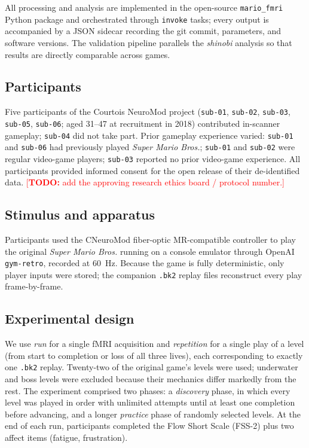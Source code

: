 \documentclass{article}
\newcommand{\TODO}[1]{\textcolor{red}{[\textbf{TODO:} #1]}}
\begin{document}
All processing and analysis are implemented in the open-source \texttt{mario\_fmri} Python
package and orchestrated through \texttt{invoke} tasks; every output is accompanied by a JSON
sidecar recording the git commit, parameters, and software versions. The validation pipeline
parallels the \textit{shinobi} analysis\cite{harel2025shinobi} so that results are directly
comparable across games.

\subsection*{Participants}
Five participants of the Courtois NeuroMod project (\texttt{sub-01}, \texttt{sub-02},
\texttt{sub-03}, \texttt{sub-05}, \texttt{sub-06}; aged 31--47 at recruitment in 2018)
contributed in-scanner gameplay; \texttt{sub-04} did not take part. Prior gameplay experience
varied: \texttt{sub-01} and \texttt{sub-06} had previously played \textit{Super Mario Bros.};
\texttt{sub-01} and \texttt{sub-02} were regular video-game players; \texttt{sub-03} reported no
prior video-game experience. All participants provided informed consent for the open release of
their de-identified data\cite{cneuromod2025,boyle2025ccn}. \TODO{add the approving research
ethics board / protocol number.}

\subsection*{Stimulus and apparatus}
Participants used the CNeuroMod fiber-optic MR-compatible controller\cite{harel2023controller}
to play the original \textit{Super Mario Bros.} running on a console emulator through OpenAI
\texttt{gym-retro}\cite{openai2018gymretro}, recorded at 60~Hz. Because the game is fully
deterministic, only player inputs were stored; the companion \texttt{.bk2} replay files
reconstruct every play frame-by-frame.

\subsection*{Experimental design}
We use \emph{run} for a single fMRI acquisition and \emph{repetition} for a single play of a
level (from start to completion or loss of all three lives), each corresponding to exactly one
\texttt{.bk2} replay. Twenty-two of the original game's levels were used; underwater and boss
levels were excluded because their mechanics differ markedly from the rest. The experiment
comprised two phases: a \emph{discovery} phase, in which every level was played in order with
unlimited attempts until at least one completion before advancing, and a longer \emph{practice}
phase of randomly selected levels. At the end of each run, participants completed the Flow Short
Scale (FSS-2) plus two affect items (fatigue, frustration).
\end{document}
